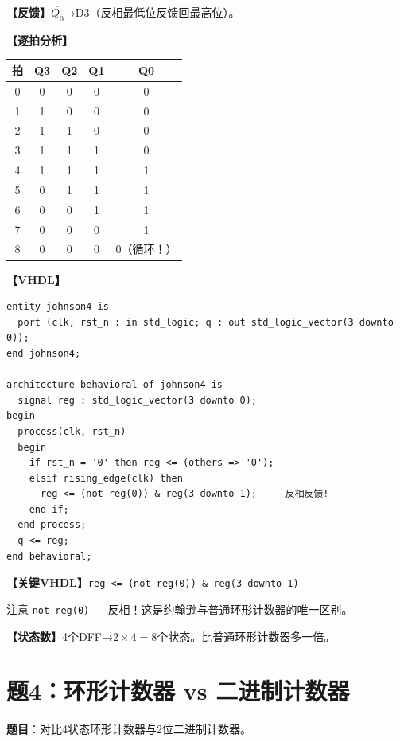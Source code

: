 \begin{solution}[完整解答]

\textbf{【反馈】}$\overline{Q_0}$→D3（反相最低位反馈回最高位）。

\textbf{【逐拍分析】}
\begin{center}
\begin{tabular}{|c|c|c|c|c|}\hline
拍 & Q3 & Q2 & Q1 & Q0 \\ \hline
0 & 0 & 0 & 0 & 0 \\ \hline
1 & 1 & 0 & 0 & 0 \\ \hline
2 & 1 & 1 & 0 & 0 \\ \hline
3 & 1 & 1 & 1 & 0 \\ \hline
4 & 1 & 1 & 1 & 1 \\ \hline
5 & 0 & 1 & 1 & 1 \\ \hline
6 & 0 & 0 & 1 & 1 \\ \hline
7 & 0 & 0 & 0 & 1 \\ \hline
8 & 0 & 0 & 0 & 0（循环！）\\ \hline
\end{tabular}
\end{center}

\textbf{【VHDL】}
\begin{lstlisting}
entity johnson4 is
  port (clk, rst_n : in std_logic; q : out std_logic_vector(3 downto 0));
end johnson4;

architecture behavioral of johnson4 is
  signal reg : std_logic_vector(3 downto 0);
begin
  process(clk, rst_n)
  begin
    if rst_n = '0' then reg <= (others => '0');
    elsif rising_edge(clk) then
      reg <= (not reg(0)) & reg(3 downto 1);  -- 反相反馈!
    end if;
  end process;
  q <= reg;
end behavioral;
\end{lstlisting}

\textbf{【关键VHDL】}\texttt{reg <= (not reg(0)) \& reg(3 downto 1)}

注意 \texttt{not reg(0)} — 反相！这是约翰逊与普通环形计数器的唯一区别。

\textbf{【状态数】}4个DFF→$2\times4=8$个状态。比普通环形计数器多一倍。

\end{solution}


\section{题4：环形计数器 vs 二进制计数器}

\textbf{题目}：对比4状态环形计数器与2位二进制计数器。

